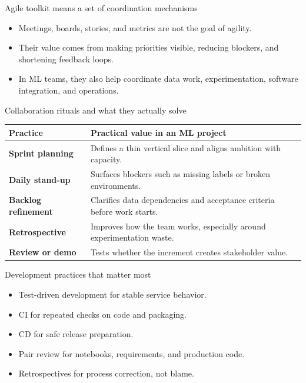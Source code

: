 \begin{frame}{Agile toolkit means a set of coordination mechanisms}
\begin{itemize}
\item Meetings, boards, stories, and metrics are not the goal of agility.
\item Their value comes from making priorities visible, reducing blockers, and shortening feedback loops.
\item In ML teams, they also help coordinate data work, experimentation, software integration, and operations.
\end{itemize}
\coursefooter
\end{frame}

\begin{frame}{Collaboration rituals and what they actually solve}
\begin{tabularx}{\textwidth}{>{\bfseries}l X}
Practice & Practical value in an ML project \\
\toprule
Sprint planning & Defines a thin vertical slice and aligns ambition with capacity. \\
Daily stand-up & Surfaces blockers such as missing labels or broken environments. \\
Backlog refinement & Clarifies data dependencies and acceptance criteria before work starts. \\
Retrospective & Improves how the team works, especially around experimentation waste. \\
Review or demo & Tests whether the increment creates stakeholder value. \\
\bottomrule
\end{tabularx}
\coursefooter
\end{frame}

\begin{frame}{Development practices that matter most}
\begin{itemize}
\item Test-driven development for stable service behavior.
\item CI for repeated checks on code and packaging.
\item CD for safe release preparation.
\item Pair review for notebooks, requirements, and production code.
\item Retrospectives for process correction, not blame.
\end{itemize}
\coursefooter
\end{frame}

